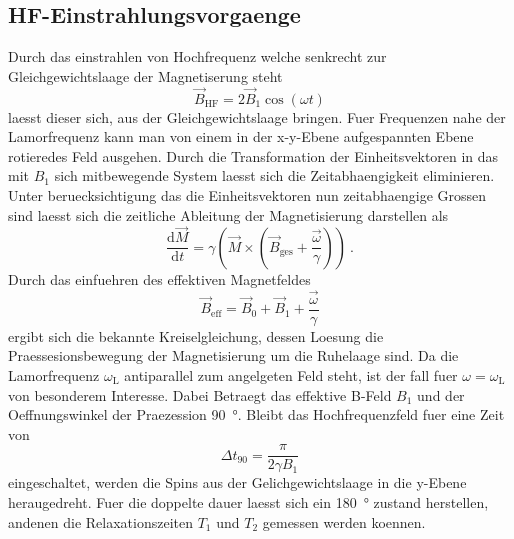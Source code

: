 \subsection{HF-Einstrahlungsvorgaenge}%
\label{sub:hf_einstrahlungsvorgaenge}
Durch das einstrahlen von Hochfrequenz welche senkrecht zur Gleichgewichtslaage
der Magnetiserung steht 
\begin{equation}
		\label{eq:bhf}
		\vec{B}_\text{HF} = 2 \vec{B}_1 \cos(\omega t)
\end{equation}
laesst dieser sich, aus der Gleichgewichtslaage bringen. 
Fuer Frequenzen nahe der Lamorfrequenz kann man von einem in der x-y-Ebene
aufgespannten Ebene rotieredes Feld ausgehen. 
Durch die Transformation der Einheitsvektoren in das mit $B_1$ sich mitbewegende
System laesst sich die Zeitabhaengigkeit eliminieren. 
Unter beruecksichtigung das die Einheitsvektoren nun zeitabhaengige Grossen sind
laesst sich die zeitliche Ableitung der Magnetisierung darstellen als 
\begin{equation}
		\label{eq:moment}
		\frac{\text{d}\vec{M}}{\text{d} t} = \gamma \left( \vec{M} \times \left(
		\vec{B}_\text{ges} + \frac{\vec{\omega}}{\gamma} \right) \right) \ .
\end{equation}
Durch das einfuehren des effektiven Magnetfeldes 
\begin{equation}
		\label{eq:sumB}
		\vec{B}_\text{eff} = \vec{B}_0 + \vec{B}_1 + \frac{\vec{\omega}}{\gamma}
\end{equation}
ergibt sich die bekannte Kreiselgleichung, dessen Loesung die
Praessesionsbewegung der Magnetisierung um die Ruhelaage sind. 
Da die Lamorfrequenz $\omega_\text{L}$ antiparallel zum angelgeten Feld steht,
ist der fall fuer $\omega = \omega_\text{L}$ von besonderem Interesse.
Dabei Betraegt das effektive B-Feld $B_1$ und der Oeffnungswinkel der
Praezession \SI{90}{\degree}. 
Bleibt das Hochfrequenzfeld fuer eine Zeit von 
\begin{equation}
		\label{eq:90kick}
		\Delta t_{90} = \frac{\pi}{2 \gamma B_1}
\end{equation}
eingeschaltet, werden die Spins aus der Gelichgewichtslaage in die y-Ebene
heraugedreht. 
Fuer die doppelte dauer laesst sich ein \SI{180}{\degree} zustand herstellen, andenen die
Relaxationszeiten $T_1$ und $T_2$ gemessen werden koennen. 

